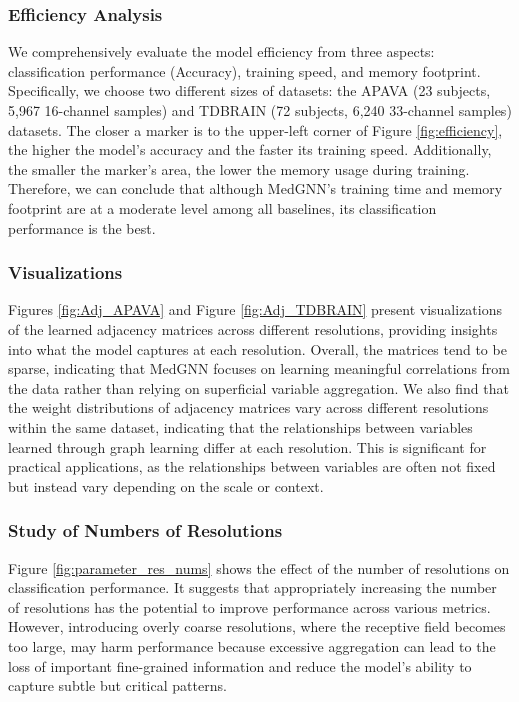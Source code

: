 \subsubsection{Efficiency Analysis}
We comprehensively evaluate the model efficiency from three aspects: classification performance (Accuracy), training speed, and memory footprint. Specifically, we choose two different sizes of datasets: the APAVA (23 subjects, 5,967 16-channel samples) and TDBRAIN (72 subjects, 6,240 33-channel samples) datasets. The closer a marker is to the upper-left corner of Figure \ref{fig:efficiency}, the higher the model's accuracy and the faster its training speed. Additionally, the smaller the marker’s area, the lower the memory usage during training. Therefore, we can conclude that although MedGNN's training time and memory footprint are at a moderate level among all baselines, its classification performance is the best. %


\subsubsection{Visualizations}
Figures \ref{fig:Adj_APAVA} and Figure \ref{fig:Adj_TDBRAIN} present visualizations of the learned adjacency matrices across different resolutions, providing insights into what the model captures at each resolution. Overall, the matrices tend to be sparse, indicating that MedGNN focuses on learning meaningful correlations from the data rather than relying on superficial variable aggregation. We also find that the weight distributions of adjacency matrices vary across different resolutions within the same dataset, indicating that the relationships between variables learned through graph learning differ at each resolution. This is significant for practical applications, as the relationships between variables are often not fixed but instead vary depending on the scale or context.



\subsubsection{Study of Numbers of Resolutions}
Figure \ref{fig:parameter_res_nums} shows the effect of the number of resolutions on classification performance. It suggests that appropriately increasing the number of resolutions has the potential to improve performance across various metrics. However, introducing overly coarse resolutions, where the receptive field becomes too large, may harm performance because excessive aggregation can lead to the loss of important fine-grained information and reduce the model's ability to capture subtle but critical patterns.


